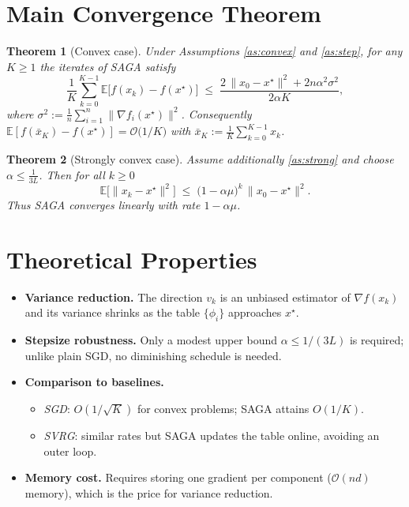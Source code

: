 \documentclass{article}
\newtheorem{theorem}{Theorem}
\newcommand{\E}{\mathbb{E}}
\begin{document}
\section*{Main Convergence Theorem}
\begin{theorem}[Convex case]\label{thm:convex}
Under Assumptions \ref{as:convex} and \ref{as:step}, for any $K\ge1$ the iterates of SAGA satisfy
\[
\frac{1}{K}\sum_{k=0}^{K-1}\E\bigl[f(x_k)-f(x^{\star})\bigr]
\;\le\;
\frac{2\,\|x_0-x^{\star}\|^{2}+2n\alpha^{2}\sigma^{2}}{2\alpha K},
\]
where $\sigma^{2}:=\frac{1}{n}\sum_{i=1}^{n}\|\nabla f_i(x^{\star})\|^{2}$.
Consequently $\E[f(\bar x_K)-f(x^{\star})]=\mathcal{O}\!\bigl(1/K\bigr)$ with $\bar x_K:=\frac1K\sum_{k=0}^{K-1}x_k$.
\end{theorem}

\begin{theorem}[Strongly convex case]\label{thm:strong}
Assume additionally \ref{as:strong} and choose $\alpha\le\frac{1}{3L}$. Then for all $k\ge0$
\[
\E\bigl[\|x_k-x^{\star}\|^{2}\bigr]\;\le\;
\bigl(1-\alpha\mu\bigr)^{k}\,\|x_0-x^{\star}\|^{2}.
\]
Thus SAGA converges linearly with rate $1-\alpha\mu$.
\end{theorem}

\section*{Theoretical Properties}
\begin{itemize}[leftmargin=*]
\item \textbf{Variance reduction.} The direction $v_k$ is an unbiased estimator of $\nabla f(x_k)$ and its variance shrinks as the table $\{\phi_i\}$ approaches $x^{\star}$.
\item \textbf{Stepsize robustness.} Only a modest upper bound $\alpha\le1/(3L)$ is required; unlike plain SGD, no diminishing schedule is needed.
\item \textbf{Comparison to baselines.}
    \begin{itemize}
    \item \emph{SGD}: $O(1/\sqrt{K})$ for convex problems; SAGA attains $O(1/K)$.
    \item \emph{SVRG}: similar rates but SAGA updates the table online, avoiding an outer loop.
    \end{itemize}
\item \textbf{Memory cost.} Requires storing one gradient per component ($\mathcal{O}(nd)$ memory), which is the price for variance reduction.
\end{itemize}
\end{document}

